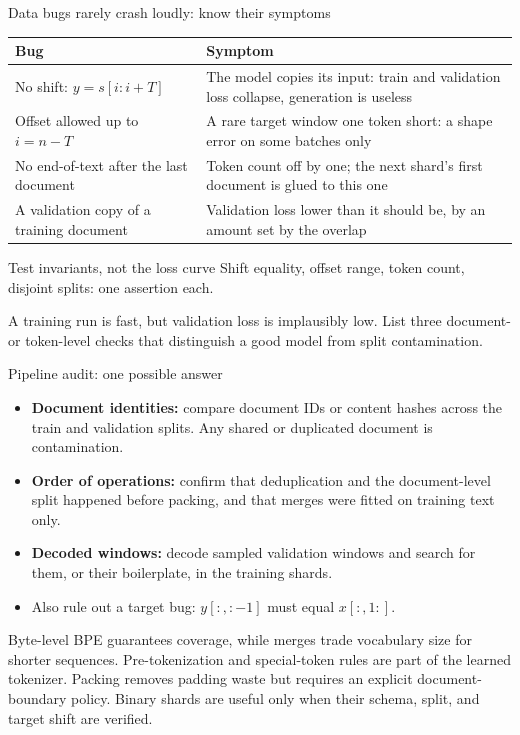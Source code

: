 \documentclass[handout]{beamer}
\begin{document}
\begin{frame}{Data bugs rarely crash loudly: know their symptoms}
  \small
  \begin{center}
    \begin{tabular}{@{}>{\raggedright\arraybackslash}p{.40\linewidth}>{\raggedright\arraybackslash}p{.54\linewidth}@{}}
      \toprule
      Bug & Symptom \\
      \midrule
      No shift: $y=s[i:i+T]$ & The model copies its input: train and validation loss collapse, generation is useless \\ \addlinespace
      Offset allowed up to $i=n-T$ & A rare target window one token short: a shape error on some batches only \\ \addlinespace
      No end-of-text after the last document & Token count off by one; the next shard's first document is glued to this one \\ \addlinespace
      A validation copy of a training document & Validation loss lower than it should be, by an amount set by the overlap \\
      \bottomrule
    \end{tabular}
  \end{center}
  \begin{alertblock}{Test invariants, not the loss curve}
    Shift equality, offset range, token count, disjoint splits: one assertion each.
  \end{alertblock}
\end{frame}

{A training run is fast, but validation loss is implausibly low. List three document- or token-level checks that distinguish a good model from split contamination.}

\begin{frame}{Pipeline audit: one possible answer}
  \begin{itemize}
      \setlength{\itemsep}{9pt}
    \item \textbf{Document identities:} compare document IDs or content hashes across the train and validation splits. Any shared or duplicated document is contamination.
    \item \textbf{Order of operations:} confirm that deduplication and the document-level split happened before packing, and that merges were fitted on training text only.
    \item \textbf{Decoded windows:} decode sampled validation windows and search for them, or their boilerplate, in the training shards.
    \item Also rule out a target bug: $y[:, :-1]$ must equal $x[:, 1:]$.
  \end{itemize}
\end{frame}

\takeaways
{Byte-level BPE guarantees coverage, while merges trade vocabulary size for shorter sequences.}
{Pre-tokenization and special-token rules are part of the learned tokenizer.}
{Packing removes padding waste but requires an explicit document-boundary policy.}
{Binary shards are useful only when their schema, split, and target shift are verified.}
\end{document}
